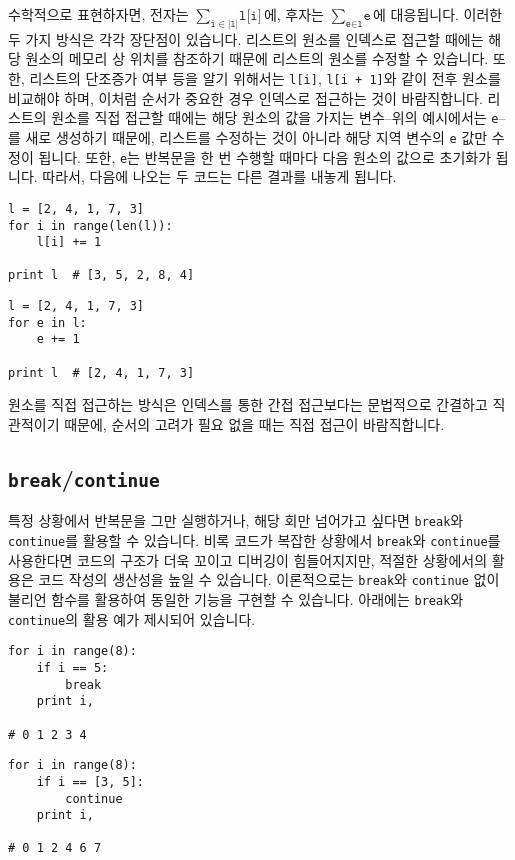 \documentclass[../main.tex]{subfiles}
\begin{document}
수학적으로 표현하자면, 전자는 $\sum_{\texttt{i} \in |\texttt{l}|} \texttt{l[i]}$에, 후자는 $\sum_{\texttt{e} \in \texttt{l}} \texttt{e}$에 대응됩니다. 이러한 두 가지 방식은 각각 장단점이 있습니다.
리스트의 원소를 인덱스로 접근할 때에는 해당 원소의 메모리 상 위치를 참조하기 때문에 리스트의 원소를 수정할 수 있습니다.
또한, 리스트의 단조증가 여부 등을 알기 위해서는 \texttt{l[i]}, \texttt{l[i + 1]}와 같이 전후 원소를 비교해야 하며, 이처럼 순서가 중요한 경우 인덱스로 접근하는 것이 바람직합니다.
리스트의 원소를 직접 접근할 때에는 해당 원소의 값을 가지는 변수--위의 예시에서는 \texttt{e}--를 새로 생성하기 때문에, 리스트를 수정하는 것이 아니라 해당 지역 변수의 \texttt{e} 값만 수정이 됩니다.
또한, \texttt{e}는 반복문을 한 번 수행할 때마다 다음 원소의 값으로 초기화가 됩니다.
따라서, 다음에 나오는 두 코드는 다른 결과를 내놓게 됩니다.
\begin{verbatim}
l = [2, 4, 1, 7, 3]
for i in range(len(l)):
    l[i] += 1

print l  # [3, 5, 2, 8, 4]
\end{verbatim}
\begin{verbatim}
l = [2, 4, 1, 7, 3]
for e in l:
    e += 1

print l  # [2, 4, 1, 7, 3]
\end{verbatim}
원소를 직접 접근하는 방식은 인덱스를 통한 간접 접근보다는 문법적으로 간결하고 직관적이기 때문에, 순서의 고려가 필요 없을 때는 직접 접근이 바람직합니다.

\subsection{\texttt{break}/\texttt{continue}}
특정 상황에서 반복문을 그만 실행하거나, 해당 회만 넘어가고 싶다면 \texttt{break}와 \texttt{continue}를 활용할 수 있습니다.
비록 코드가 복잡한 상황에서 \texttt{break}와 \texttt{continue}를 사용한다면 코드의 구조가 더욱 꼬이고 디버깅이 힘들어지지만, 적절한 상황에서의 활용은 코드 작성의 생산성을 높일 수 있습니다.
이론적으로는 \texttt{break}와 \texttt{continue} 없이 불리언 함수를 활용하여 동일한 기능을 구현할 수 있습니다.
아래에는 \texttt{break}와 \texttt{continue}의 활용 예가 제시되어 있습니다.
\begin{verbatim}
for i in range(8):
    if i == 5:
        break
    print i,

# 0 1 2 3 4
\end{verbatim}
\begin{verbatim}
for i in range(8):
    if i == [3, 5]:
        continue
    print i,

# 0 1 2 4 6 7
\end{verbatim}
\end{document}
